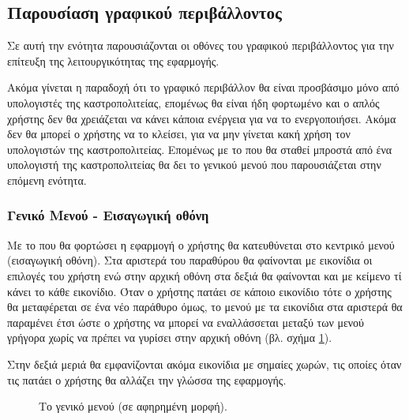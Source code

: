 \documentclass{assignment}
\begin{document}
\subsection{Παρουσίαση γραφικού περιβάλλοντος}
\label{gui}

Σε αυτή την ενότητα παρουσιάζονται οι οθόνες του γραφικού περιβάλλοντος για την επίτευξη της λειτουργικότητας της εφαρμογής.

Ακόμα γίνεται η παραδοχή ότι το γραφικό περιβάλλον θα είναι προσβάσιμο μόνο από υπολογιστές της καστροπολιτείας, επομένως θα είναι ήδη φορτωμένο και ο απλός χρήστης δεν θα χρειάζεται να κάνει κάποια ενέργεια για να το ενεργοποιήσει. Ακόμα δεν θα μπορεί ο χρήστης να το κλείσει, για να μην γίνεται κακή χρήση τον υπολογιστών της καστροπολιτείας. Επομένως με το που θα σταθεί μπροστά από ένα υπολογιστή της καστροπολιτείας θα δει το γενικού μενού που παρουσιάζεται στην επόμενη ενότητα.

\subsubsection{Γενικό Μενού - Εισαγωγική οθόνη}

Με το που θα φορτώσει η εφαρμογή ο χρήστης θα κατευθύνεται στο κεντρικό μενού (εισαγωγική οθόνη). Στα αριστερά του παραθύρου θα φαίνονται με εικονίδια οι επιλογές του χρήστη ενώ στην αρχική οθόνη στα δεξιά θα φαίνονται και με κείμενο τί κάνει το κάθε εικονίδιο. Όταν ο χρήστης πατάει σε κάποιο εικονίδιο τότε ο χρήστης θα μεταφέρεται σε ένα νέο παράθυρο όμως, το μενού με τα εικονίδια στα αριστερά θα παραμένει έτσι ώστε ο χρήστης να μπορεί να εναλλάσσεται μεταξύ των μενού γρήγορα χωρίς να πρέπει να γυρίσει στην αρχική οθόνη (βλ. σχήμα \ref{fig:menu:general}). 

Στην δεξιά μεριά θα εμφανίζονται ακόμα εικονίδια με σημαίες χωρών, τις οποίες όταν τις πατάει ο χρήστης θα αλλάζει την γλώσσα της εφαρμογής.

\begin{figure}
\begin{center}
\caption{Το γενικό μενού (σε αφηρημένη μορφή).}
\label{fig:menu:general}
\end{center}
\end{figure}
\end{document}
